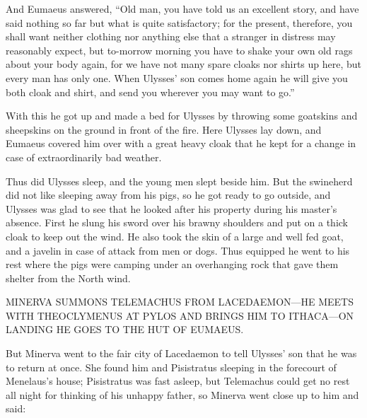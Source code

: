 And Eumaeus answered, “Old man, you have told us an excellent story, and have
said nothing so far but what is quite satisfactory; for the present, therefore,
you shall want neither clothing nor anything else that a stranger in distress
may reasonably expect, but to-morrow morning you have to shake your own old
rags about your body again, for we have not many spare cloaks nor shirts up
here, but every man has only one. When Ulysses’ son comes home again he will
give you both cloak and shirt, and send you wherever you may want to go.”

With this he got up and made a bed for Ulysses by throwing some goatskins and
sheepskins on the ground in front of the fire. Here Ulysses lay down, and
Eumaeus covered him over with a great heavy cloak that he kept for a change in
case of extraordinarily bad weather.

Thus did Ulysses sleep, and the young men slept beside him. But the swineherd
did not like sleeping away from his pigs, so he got ready to go outside, and
Ulysses was glad to see that he looked after his property during his master’s
absence. First he slung his sword over his brawny shoulders and put on a thick
cloak to keep out the wind. He also took the skin of a large and well fed goat,
and a javelin in case of attack from men or dogs. Thus equipped he went to his
rest where the pigs were camping under an overhanging rock that gave them
shelter from the North wind.


MINERVA SUMMONS TELEMACHUS FROM LACEDAEMON—HE MEETS WITH THEOCLYMENUS AT PYLOS
AND BRINGS HIM TO ITHACA—ON LANDING HE GOES TO THE HUT OF EUMAEUS.

But Minerva went to the fair city of Lacedaemon to tell Ulysses’ son that he
was to return at once. She found him and Pisistratus sleeping in the forecourt
of Menelaus’s house; Pisistratus was fast asleep, but Telemachus could get no
rest all night for thinking of his unhappy father, so Minerva went close up to
him and said:

